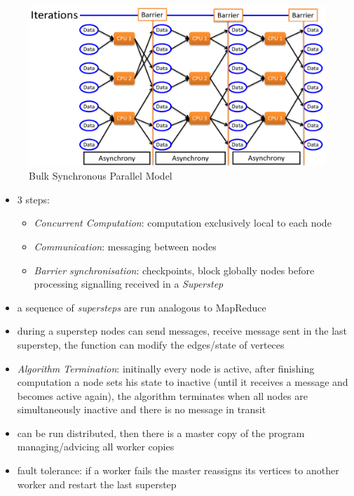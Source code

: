 \documentclass[a4paper]{article}
\begin{document}
\begin{multicols}{3}
\begin{figure}[H]
    \includegraphics[width=\linewidth]{BSPModel.png}
    \caption{Bulk Synchronous Parallel Model}
    \label{fig:bspmodel}
\end{figure}

\begin{itemize}
    \item 3 steps:
        \begin{itemize}
            \item \textit{Concurrent Computation}: computation exclusively local to each node
            \item \textit{Communication}: messaging between nodes
            \item \textit{Barrier synchronisation}: checkpoints, block globally nodes before processing signalling received in a \textit{Superstep}
        \end{itemize}
    \item a sequence of \textit{supersteps} are run analogous to MapReduce
    \item during a superstep nodes can send messages, receive message sent in the last superstep, the function can modify the edges/state of verteces
    \item \textit{Algorithm Termination}: initinally every node is active, after finishing computation a node sets his state to inactive (until it receives a message and
    becomes active again), the algorithm terminates when all nodes are simultaneously inactive and there is no message in transit
    \item can be run distributed, then there is a master copy of the program managing/advicing all worker copies 
    \item fault tolerance: if a worker fails the master reassigns its vertices to another worker and restart the last superstep 
\end{itemize}


\end{multicols}
\end{document}
